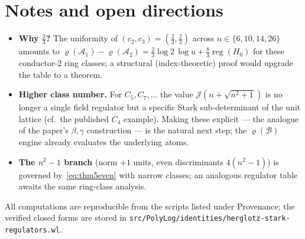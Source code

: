 \documentclass[11pt]{article}
\newcommand{\Jc}{\mathcal{J}}
\newcommand{\reg}{\operatorname{reg}}
\newcommand{\rhoB}{\varrho}
\begin{document}
\section{Notes and open directions}
\begin{itemize}\itemsep1pt
  \item \textbf{Why $\tfrac23$?} The uniformity of $(c_2,c_3)=(\tfrac23,\tfrac23)$
        across $n\in\{6,10,14,26\}$ amounts to
        $\rhoB(\mathcal A_1)-\rhoB(\mathcal A_2)=\tfrac23\log2\,\log u+\tfrac83\reg(H_0)$
        for these conductor-$2$ ring classes; a structural (index-theoretic)
        proof would upgrade the table to a theorem.
  \item \textbf{Higher class number.} For $C_5,C_7,\ldots$ the value
        $\Jc(n+\sqrt{n^2+1})$ is no longer a single field regulator but a
        specific Stark sub-determinant of the unit lattice (cf.\ the published
        $C_4$ example). Making these explicit --- the analogue of the paper's
        $\beta,\gamma$ construction --- is the natural next step; the
        $\rhoB(\mathcal B)$ engine already evaluates the underlying atoms.
  \item \textbf{The $n^2-1$ branch} (norm $+1$ units, even discriminants
        $4(n^2-1)$) is governed by~\eqref{eq:thm5even} with narrow classes; an
        analogous regulator table awaits the same ring-class analysis.
\end{itemize}

All computations are reproducible from the scripts listed under Provenance; the
verified closed forms are stored in
\texttt{src/PolyLog/identities/herglotz-stark-regulators.wl}.
\end{document}
